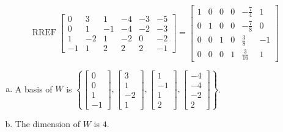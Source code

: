 \begin{exerciseAnswer} 


\[\operatorname{RREF} \left[\begin{array}{cccccc}
0 & 3 & 1 & -4 & -3 & -5 \\
0 & 1 & -1 & -4 & -2 & -3 \\
1 & -2 & 1 & -2 & 0 & -2 \\
-1 & 1 & 2 & 2 & 2 & -1
\end{array}\right] = \left[\begin{array}{cccccc}
1 & 0 & 0 & 0 & -\frac{7}{4} & 1 \\
0 & 1 & 0 & 0 & -\frac{7}{8} & 0 \\
0 & 0 & 1 & 0 & \frac{3}{8} & -1 \\
0 & 0 & 0 & 1 & \frac{3}{16} & 1
\end{array}\right] \]


\begin{enumerate}[(a)]
\item A basis of \(W\) is \( \left\{ \left[\begin{array}{c}
0 \\
0 \\
1 \\
-1
\end{array}\right] , \left[\begin{array}{c}
3 \\
1 \\
-2 \\
1
\end{array}\right] , \left[\begin{array}{c}
1 \\
-1 \\
1 \\
2
\end{array}\right] , \left[\begin{array}{c}
-4 \\
-4 \\
-2 \\
2
\end{array}\right] \right\} \).
\item The dimension of \(W\) is \( 4 \).
\end{enumerate}
    
\end{exerciseAnswer}
    
